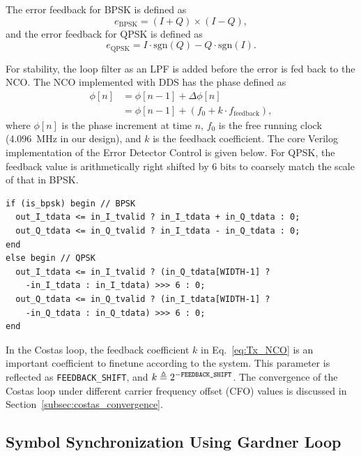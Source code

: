 \documentclass[journal,twoside]{IEEEtran}
\begin{document}
      The error feedback for BPSK is defined as
      \begin{equation}
        e_{\text{BPSK}}=(I+Q)\times(I-Q),
      \end{equation}
      and the error feedback for QPSK is defined as
      \begin{equation}
        e_{\text{QPSK}}=I\cdot\mathrm{sgn}(Q)-Q\cdot\mathrm{sgn}(I).
      \end{equation}

      For stability, the loop filter as an LPF is added before the error is fed back to the NCO.     
      The NCO implemented with DDS has the phase defined as
      \begin{equation}\label{eq:Tx_NCO}
        \begin{aligned}
          \phi[n]&=\phi[n-1]+\Delta\phi[n]\\
          &=\phi[n-1]+(f_0+k\cdot f_{\text{feedback}}),
        \end{aligned}
      \end{equation}
      where $\phi[n]$ is the phase increment at time $n$,
      $f_0$ is the free running clock (\qty{4.096}{MHz} in our design),
      and $k$ is the feedback coefficient.
      The core Verilog implementation of the Error Detector Control is given below.
      For QPSK, the feedback value is arithmetically right shifted by 6 bits
      to coarsely match the scale of that in BPSK.
      \begin{verbatim}
if (is_bpsk) begin // BPSK
  out_I_tdata <= in_I_tvalid ? in_I_tdata + in_Q_tdata : 0;
  out_Q_tdata <= in_Q_tvalid ? in_I_tdata - in_Q_tdata : 0;
end
else begin // QPSK
  out_I_tdata <= in_I_tvalid ? (in_Q_tdata[WIDTH-1] ?
    -in_I_tdata : in_I_tdata) >>> 6 : 0;
  out_Q_tdata <= in_Q_tvalid ? (in_I_tdata[WIDTH-1] ?
    -in_Q_tdata : in_Q_tdata) >>> 6 : 0;
end
      \end{verbatim}
      
      In the Costas loop,
      the feedback coefficient $k$ in Eq.~\eqref{eq:Tx_NCO}
      is an important coefficient to finetune according to the system.
      This parameter is reflected as \texttt{FEEDBACK\_SHIFT}, and $k\triangleq2^{-\text{\texttt{FEEDBACK\_SHIFT}}}$.
      The convergence of the Costas loop under different carrier frequency offset (CFO) values is discussed in Section~\ref{subsec:costas_convergence}.

    \subsection{Symbol Synchronization Using Gardner Loop}
\end{document}
